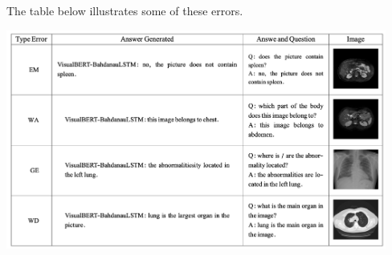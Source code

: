 \documentclass{adonis}
\begin{document}
The table below illustrates some of these errors.

\vspace{3pt}

 \begin{center}
       \hspace*{-0.2cm}\includegraphics[width=12.5cm]{images/eval_table.png}
\end{center}





  
  


\end{document}
